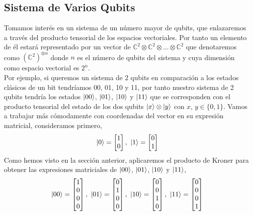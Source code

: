 \documentclass[a4paper]{article}
\numberwithin{equation}{section}
\begin{document}
\subsection{Sistema de Varios Qubits}

Tomamos interés en un sistema de un número mayor de qubits, que enlazaremos a través del producto tensorial de los espacios vectoriales. Por tanto un elemento de él estará representado por un vector de $\mathbb{C}^2 \otimes \mathbb{C}^2 \otimes \ldots \otimes \mathbb{C}^2$ que denotaremos como $(\mathbb{C}^2)^{\otimes n}$ donde $n$ es el número de qubits del sistema y cuya dimensión como espacio vectorial es $2^n$.\\
\linebreak
Por ejemplo, si queremos un sistema de 2 qubits en comparación a los estados clásicos de un bit tendríamos 00, 01, 10 y 11, por tanto nuestro sistema de 2 qubits tendría los estados $\ket{00}$, $\ket{01}$, $\ket{10}$ y $\ket{11}$ que se corresponden con el producto tensorial del estado de los dos qubits $\ket{x}\otimes\ket{y}$ con $x$, $y\in \lbrace 0, 1\rbrace$.
Vamos a trabajar más cómodamente con coordenadas del vector en su expresión matricial, consideramos primero,
\begin{equation}
\ket{0} = \begin{bmatrix}
	1 \\ 0
\end{bmatrix}, \ 
\ket{1} = \begin{bmatrix}
	0 \\ 1
\end{bmatrix}
\end{equation}
Como hemos visto en la sección anterior, aplicaremos el producto de  Kroner para obtener las expresiones matriciales de $\ket{00}$, $\ket{01}$, $\ket{10}$ y $\ket{11}$,
\begin{equation}
\ket{00} =
\begin{bmatrix}
	1 \\ 0 \\ 0 \\ 0
\end{bmatrix}, \ 
\ket{01} =
\begin{bmatrix}
	0 \\ 1 \\ 0 \\ 0
\end{bmatrix}, \ 
\ket{10} =
\begin{bmatrix}
	0 \\ 0 \\ 1 \\ 0
\end{bmatrix}, \ 
\ket{11} =
\begin{bmatrix}
	0 \\ 0 \\ 0 \\ 1
\end{bmatrix}
\end{equation}
\end{document}
